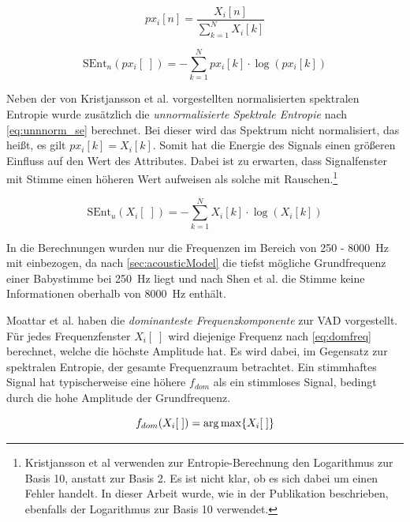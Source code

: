 \begin{equation}
px_i[n] = \frac{X_i[n]}{\sum_{k=1}^{N} X_i[k]}
\label{eq:norm_spek}
\end{equation}

\begin{equation}
\text{SEnt}_n(px_i[\;]) = -\sum_{k=1}^{N}px_i[k] \cdot\log(px_i[k])
\label{eq:norm_se}
\end{equation}

Neben der von Kristjansson et al. \cite{vad_Lisboa} vorgestellten normalisierten spektralen Entropie wurde zusätzlich die \emph{unnormalisierte Spektrale Entropie} nach \autoref{eq:unnnorm_se} berechnet. Bei dieser wird das Spektrum nicht normalisiert, das heißt, es gilt $px_i[k] = X_i[k]$. Somit hat die Energie des Signals einen größeren Einfluss auf den Wert des Attributes. Dabei ist zu erwarten, dass Signalfenster mit Stimme einen höheren Wert aufweisen als solche mit Rauschen.\footnote{Kristjansson et al \cite[S. 2]{vad_Lisboa} verwenden zur Entropie-Berechnung den Logarithmus zur Basis 10, anstatt zur Basis 2. Es ist nicht klar, ob es sich dabei um einen Fehler handelt. In dieser Arbeit wurde, wie in der Publikation beschrieben, ebenfalls der Logarithmus zur Basis 10 verwendet.}

\begin{equation}
\text{SEnt}_u(X_i[\;]) = -\sum_{k=1}^{N}X_i[k] \cdot\log(X_i[k])
\label{eq:unnnorm_se}
\end{equation}

In die Berechnungen wurden nur die Frequenzen im Bereich von 250 - \SI{8000}{\hertz} mit einbezogen, da nach \autoref{sec:acousticModel} die tiefst mögliche Grundfrequenz einer Babystimme bei \SI{250}{\hertz} liegt und nach Shen et al. \cite{vad_entropie02} die Stimme keine Informationen oberhalb von \SI{8000}{\hertz} enthält.

Moattar et al. \cite[S. 2550]{vad_Easy} haben die \emph{dominanteste Frequenzkomponente} zur VAD vorgestellt. Für jedes Frequenzfenster $X_i[\;]$ wird diejenige Frequenz nach  \autoref{eq:domfreq} berechnet, welche die höchste Amplitude hat. Es wird dabei, im Gegensatz zur spektralen Entropie, der gesamte Frequenzraum betrachtet. Ein stimmhaftes Signal hat typischerweise eine höhere $f_{dom}$ als ein stimmloses Signal, bedingt durch die hohe Amplitude der Grundfrequenz.\cite[S. 2550]{vad_Easy}

\begin{equation}
f_{dom}(X_i[\;]) = \operatorname*{arg\,max} \{X_i[\;]\}
\label{eq:domfreq}
\end{equation}


